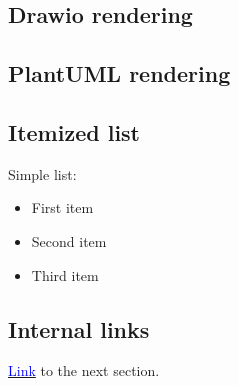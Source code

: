 \subsection{Drawio rendering}

\subsection{PlantUML rendering}


\subsection{Itemized list}
Simple list:

\begin{itemize}
    \item First item
    \item Second item
    \item Third item
\end{itemize}

\subsection{Internal links}

\hyperref[sec:sec2_label]{\textcolor{blue}{Link}} to the next section.